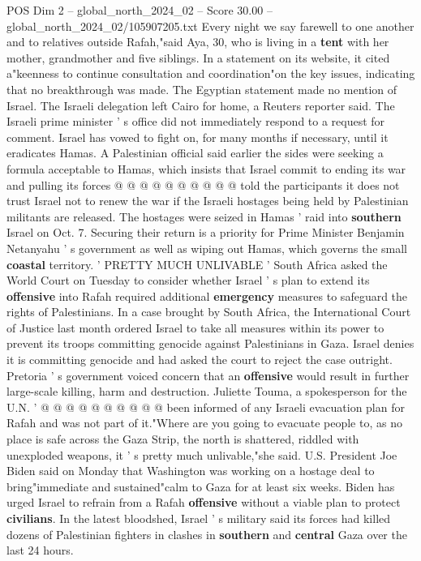 \begin{textsample}{POS Dim 2 – global\_north\_2024\_02 – Score 30.00 – global\_north\_2024\_02/105907205.txt}
Every night we say farewell to one another and to relatives outside Rafah,"said Aya, 30, who is living in a \textbf{tent} with her mother, grandmother and five siblings.
In a statement on its website, it cited a"keenness to continue consultation and coordination"on the key issues, indicating that no breakthrough was made.
The Egyptian statement made no mention of Israel.
The Israeli delegation left Cairo for home, a Reuters reporter said.
The Israeli prime minister ' s office did not immediately respond to a request for comment.
Israel has vowed to fight on, for many months if necessary, until it eradicates Hamas.
A Palestinian official said earlier the sides were seeking a formula acceptable to Hamas, which insists that Israel commit to ending its war and pulling its forces @ @ @ @ @ @ @ @ @ @ told the participants it does not trust Israel not to renew the war if the Israeli hostages being held by Palestinian militants are released.
The hostages were seized in Hamas ' raid into \textbf{southern} Israel on Oct. 7.
Securing their return is a priority for Prime Minister Benjamin Netanyahu ' s government as well as wiping out Hamas, which governs the small \textbf{coastal} territory. ' PRETTY MUCH UNLIVABLE ' South Africa asked the World Court on Tuesday to consider whether Israel ' s plan to extend its \textbf{offensive} into Rafah required additional \textbf{emergency} measures to safeguard the rights of Palestinians.
In a case brought by South Africa, the International Court of Justice last month ordered Israel to take all measures within its power to prevent its troops committing genocide against Palestinians in Gaza.
Israel denies it is committing genocide and had asked the court to reject the case outright.
Pretoria ' s government voiced concern that an \textbf{offensive} would result in further large-scale killing, harm and destruction.
Juliette Touma, a spokesperson for the U.N. ' @ @ @ @ @ @ @ @ @ @ been informed of any Israeli evacuation plan for Rafah and was not part of it."Where are you going to evacuate people to, as no place is safe across the Gaza Strip, the north is shattered, riddled with unexploded weapons, it ' s pretty much unlivable,"she said.
U.S.
President Joe Biden said on Monday that Washington was working on a hostage deal to bring"immediate and sustained"calm to Gaza for at least six weeks.
Biden has urged Israel to refrain from a Rafah \textbf{offensive} without a viable plan to protect \textbf{civilians}.
In the latest bloodshed, Israel ' s military said its forces had killed dozens of Palestinian fighters in clashes in \textbf{southern} and \textbf{central} Gaza over the last 24 hours.

\end{textsample}

